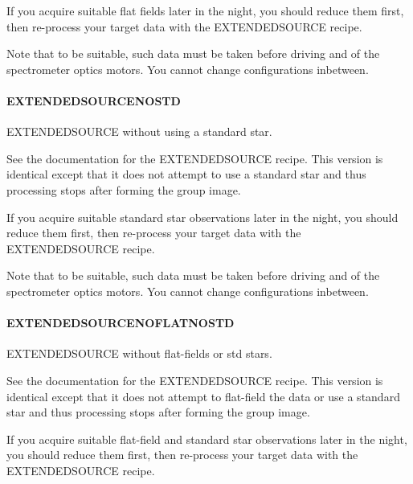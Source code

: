 \documentclass[twoside,11pt]{article}
\renewcommand{\_}{\texttt{\symbol{95}}}
\begin{document}
If you acquire suitable flat fields later in the night, you should
reduce them first, then re-process your target data with the
EXTENDED\_SOURCE recipe.



Note that to be suitable, such data must be taken before driving and
of the spectrometer optics motors. You cannot change configurations
inbetween.

\paragraph{EXTENDED\_SOURCE\_NOSTD\label{EXTENDED_SOURCE_NOSTD}}


EXTENDED\_SOURCE without using a standard star.


\mbox{}


See the documentation for the EXTENDED\_SOURCE recipe. This version is
identical except that it does not attempt to use a standard star and
thus processing stops after forming the group image.



If you acquire suitable standard star observations later in the night,
you should reduce them first, then re-process your target data with
the EXTENDED\_SOURCE recipe.



Note that to be suitable, such data must be taken before driving and
of the spectrometer optics motors. You cannot change configurations
inbetween.

\paragraph{EXTENDED\_SOURCE\_NOFLAT\_NOSTD\label{EXTENDED_SOURCE_NOFLAT_NOSTD}}


EXTENDED\_SOURCE without flat-fields or std stars.


\mbox{}


See the documentation for the EXTENDED\_SOURCE recipe. This version is
identical except that it does not attempt to flat-field the data or
use a standard star and thus processing stops after forming the group
image.



If you acquire suitable flat-field and standard star observations later
in the night, you should reduce them first, then re-process your
target data with the EXTENDED\_SOURCE recipe.
\end{document}
